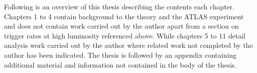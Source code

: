 















Following is an overview of this thesis describing the contents each chapter. Chapters 1 to 4 contain background to the theory and the ATLAS experiment and does not contain work carried out by the author apart from a section on trigger rates at high luminosity referenced above. While chapters 5 to 11 detail analysis work carried out by the author where related work not completed by the author has been indicated. The thesis is followed by an appendix containing additional material and information not contained in the body of the thesis.

